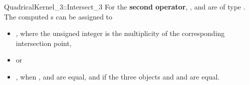 \begin{ccRefFunctionObjectConcept}{QuadricalKernel_3::Intersect_3}
For the \textbf{second operator}, ,  and 
are of type . 
The computed s can be assigned to 
\begin{itemize}
\item {} ,
where the unsigned integer is the multiplicity of the corresponding
intersection point,
\item {}  or
\item {} , when ,  and  
are equal, and if the three objects  and  and 
are equal.
\end{itemize} 

\end{ccRefFunctionObjectConcept}
